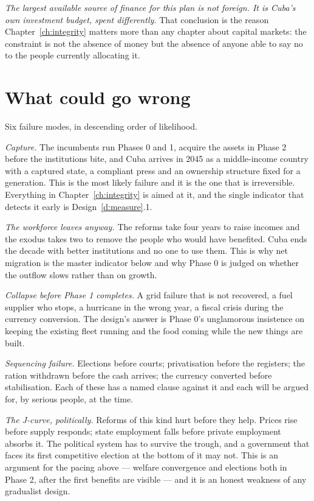 \emph{The largest available source of finance for this plan is not foreign. It
is Cuba's own investment budget, spent differently.} That conclusion is the
reason
Chapter~\ref{ch:integrity} matters more than any chapter about capital markets:
the constraint is not the absence of money but the absence of anyone able to
say no to the people currently allocating it.

\section{What could go wrong}

Six failure modes, in descending order of likelihood.

\emph{Capture.} The incumbents run Phases 0 and 1, acquire the assets in Phase 2
before the institutions bite, and Cuba arrives in 2045 as a middle-income country
with a captured state, a compliant press and an ownership structure fixed for a
generation. This is the most likely failure and it is the one that is
irreversible. Everything in Chapter~\ref{ch:integrity} is aimed at it, and the
single indicator that detects it early is Design~\ref{d:measure}.1.

\emph{The workforce leaves anyway.} The reforms take four years to raise incomes
and the exodus takes two to remove the people who would have benefited. Cuba
ends the decade with better institutions and no one to use them. This is why net
migration is the master indicator below and why Phase 0 is judged on whether the
outflow slows rather than on growth.

\emph{Collapse before Phase 1 completes.} A grid failure that is not recovered, a
fuel supplier who stops, a hurricane in the wrong year, a fiscal crisis during
the currency conversion. The design's answer is Phase 0's unglamorous
insistence on keeping the existing fleet running and the food coming while the
new things are built.

\emph{Sequencing failure.} Elections before courts; privatisation before the
registers; the ration withdrawn before the cash arrives; the currency converted
before stabilisation. Each of these has a named clause against it and each will
be argued for, by serious people, at the time.

\emph{The J-curve, politically.} Reforms of this kind hurt before they help.
Prices rise before supply responds; state employment falls before private
employment absorbs it. The political system has to survive the trough, and a
government that faces its first competitive election at the bottom of it may not.
This is an argument for the pacing above --- welfare convergence and elections
both in Phase 2, after the first benefits are visible --- and it is an honest
weakness of any gradualist design.

